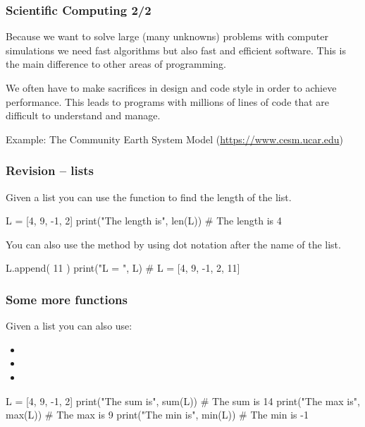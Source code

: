 \documentclass[hyperref={pdfpagelabels=false},table, handout]{beamer}
\begin{document}
\begin{frame}\frametitle{Scientific Computing 2/2}

Because we want to solve large (many unknowns) problems with computer simulations
we need fast algorithms but also fast and efficient software.
This is the main difference to other areas of programming. \\

\vskip 10pt

We often have to make sacrifices in design and code style in order to achieve performance.
This leads to programs with millions of lines of code that are difficult to understand and manage.

\vskip 10pt
  Example: The Community Earth System Model (\url{https://www.cesm.ucar.edu})

\end{frame}

\begin{frame}[fragile]\frametitle{Revision -- lists}

  Given a list  you can use the function  to find the length of the list.

\begin{python}
  L = [4, 9, -1, 2]
  print("The length is", len(L)) # The length is 4
\end{python}

  \pause

  \vskip 5pt

  You can also use the method  by using dot notation after the name of the list.

\begin{python}
  L.append( 11 )
  print("L = ", L) # L = [4, 9, -1, 2, 11]
\end{python}


\end{frame}

\begin{frame}[fragile]\frametitle{Some more functions}

 Given a list  you can also use:

  \begin{itemize}
    \item {}
    \item {}
    \item {}
  \end{itemize}

  \pause

\begin{python}
  L = [4, 9, -1, 2]
  print("The sum is", sum(L)) # The sum is 14
  print("The max is", max(L)) # The max is 9
  print("The min is", min(L)) # The min is -1
\end{python}

\end{frame}
\end{document}
